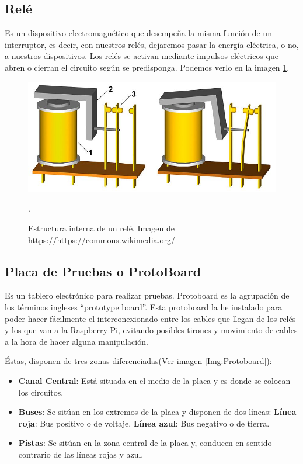 \subsection{Relé}
Es un dispositivo electromagnético que desempeña la misma función de un interruptor, es decir, con nuestros relés, dejaremos pasar la energía eléctrica, o no, a nuestros dispositivos. Los relés se activan mediante impulsos eléctricos que abren o cierran el circuito según se predisponga. Podemos verlo en la imagen \ref{Img:Rele1}.
\begin{figure}
    \centering
    \includegraphics[width=\textwidth]{img/Rele_1.jpg}
    \caption{Estructura interna de un relé. Imagen de \url{https://https://commons.wikimedia.org/}\cite{manual:GNU}}. \label{Img:Rele1}
\end{figure}

\subsection{Placa de Pruebas o ProtoBoard}
Es un tablero electrónico para realizar pruebas. Protoboard es la agrupación de los términos ingleses “prototype board”.
Esta protoboard la he instalado para poder hacer fácilmente el interconexionado entre los cables que llegan de los relés y los que van a la Raspberry Pi, evitando posibles tirones y movimiento de cables a la hora de hacer alguna manipulación.

Éstas, disponen de tres zonas diferenciadas(Ver imagen \ref{Img:Protoboard}):

\begin{itemize}
    \item \textbf{Canal Central}: Está situada en el medio de la placa y es donde se colocan los circuitos.
    \item \textbf{Buses}: Se sitúan en los extremos de la placa y disponen de dos líneas:
        \subitem \textbf{Línea roja}: Bus positivo o de voltaje.
        \subitem \textbf{Línea azul}: Bus negativo o de tierra.
    \item \textbf{Pistas}: Se sitúan en la zona central de la placa y, conducen en sentido contrario de las líneas rojas y azul.
\end{itemize}


